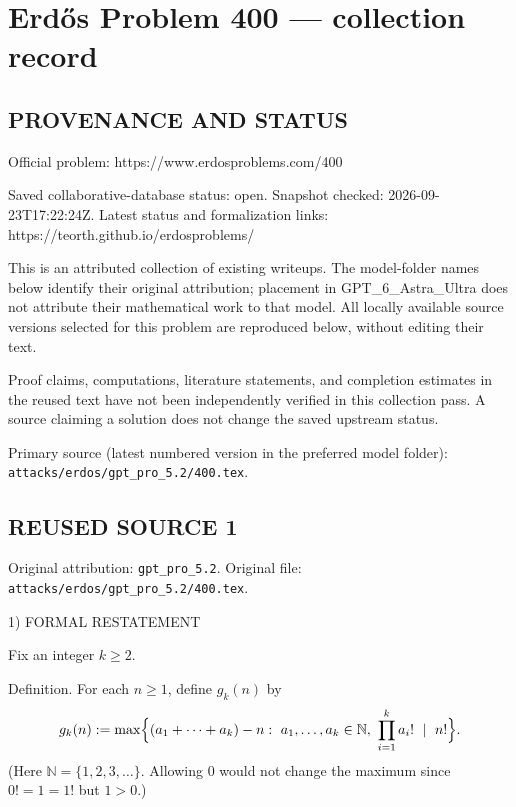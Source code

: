 \section*{Erd\H{o}s Problem 400 --- collection record}

\subsection*{PROVENANCE AND STATUS}
Official problem: https://www.erdosproblems.com/400

Saved collaborative-database status: open.
Snapshot checked: 2026-09-23T17:22:24Z.
Latest status and formalization links: https://teorth.github.io/erdosproblems/

This is an attributed collection of existing writeups. The model-folder names below identify their original attribution; placement in GPT\_6\_Astra\_Ultra does not attribute their mathematical work to that model. All locally available source versions selected for this problem are reproduced below, without editing their text.

Proof claims, computations, literature statements, and completion estimates in the reused text have not been independently verified in this collection pass. A source claiming a solution does not change the saved upstream status.

Primary source (latest numbered version in the preferred model folder): \texttt{attacks/erdos/gpt\_pro\_5.2/400.tex}.

\subsection*{REUSED SOURCE 1}
Original attribution: \texttt{gpt\_pro\_5.2}.
Original file: \texttt{attacks/erdos/gpt\_pro\_5.2/400.tex}.


1) FORMAL RESTATEMENT

Fix an integer $k\ge 2$.

Definition.
For each $n\ge 1$, define $g_k(n)$ by
\[
 g_k(n):=\max\Bigl\{ (a_1+\cdots+a_k)-n:\ a_1,\dots,a_k\in\mathbb N,\ \prod_{i=1}^k a_i!\ \mid\ n!\Bigr\}.
\]
(Here $\mathbb N=\{1,2,3,\dots\}$. Allowing $0$ would not change the maximum since $0!=1=1!$ but $1>0$.)

